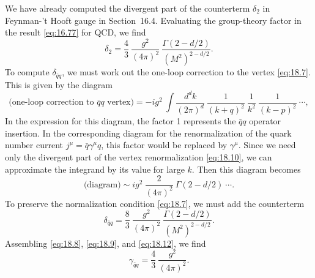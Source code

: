 We have already computed the divergent part of the counterterm $\delta_2$ in
Feynman-'t Hooft gauge in Section~16.4.  Evaluating the group-theory factor
in the result \eqref{eq:16.77} for QCD, we find
\begin{equation}
  \delta_2 = \frac{4}{3}\ \frac{g^2}{(4\pi)^2}\ \frac{\Gamma(2-d/2)}
    {(M^2)^{2-d/2}} .
  \label{eq:18.9}
\end{equation}
To compute $\delta_{\bar{q}q}$, we must work out the one-loop correction to
the vertex \eqref{eq:18.7}.  This is given by the diagram
\begin{equation}
  \text{(one-loop correction to } \bar{q}q \text{ vertex)}
  = -ig^2\ \int \frac{d^dk}{(2\pi)^d}\ \frac{1}{(k+q)^2}\ \frac{1}{k^2}\
    \frac{1}{(k-p)^2}\ \cdots ,
  \label{eq:18.10}
\end{equation}
In the expression for this diagram, the factor 1 represents the $\bar{q}q$
operator insertion.  In the corresponding diagram for the renormalization of
the quark number current $j^\mu = \bar{q}\gamma^\mu q$, this factor would be
replaced by $\gamma^\mu$.  Since we need only the divergent part of the
vertex renormalization \eqref{eq:18.10}, we can approximate the integrand by
its value for large $k$.  Then this diagram becomes
\begin{equation}
  \text{(diagram)} \sim ig^2\ \frac{2}{(4\pi)^2}\ \Gamma(2-d/2)\ \cdots .
  \label{eq:18.11}
\end{equation}
To preserve the normalization condition \eqref{eq:18.7}, we must add the
counterterm
\begin{equation}
  \delta_{\bar{q}q} = \frac{8}{3}\ \frac{g^2}{(4\pi)^2}\ \frac{\Gamma(2-d/2)}
    {(M^2)^{2-d/2}} .
  \label{eq:18.12}
\end{equation}
Assembling \eqref{eq:18.8}, \eqref{eq:18.9}, and \eqref{eq:18.12}, we find
\begin{equation}
  \gamma_{\bar{q}q} = \frac{4}{3}\ \frac{g^2}{(4\pi)^2} .
  \label{eq:18.13}
\end{equation}

